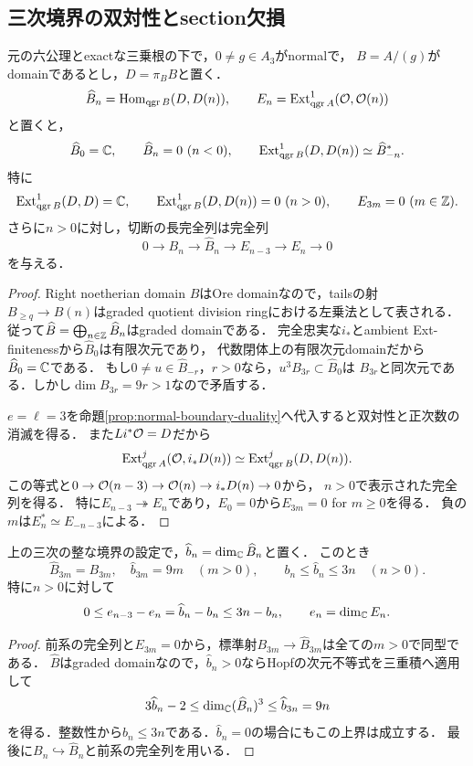 \documentclass[11pt,a4paper]{ltjsarticle}
\begin{document}
\subsection{三次境界の双対性とsection欠損}

\begin{corollary}[三次の整な境界と反標準剰余類の消滅]\label{cor:cubic-boundary-duality}
元の六公理とexactな三乗根の下で，$0\ne g\in A_3$がnormalで，
$B=A/(g)$がdomainであるとし，$D=\pi_BB$と置く．
\[
 \widehat B_n=\operatorname{Hom}_{\operatorname{qgr} B}(D,D(n)),\qquad E_n=\operatorname{Ext}^1_{\operatorname{qgr} A}(\mathcal O,\mathcal O(n))
\]
と置くと，
\[
 \widehat B_0=\C,\qquad \widehat B_n=0\ (n<0),\qquad
 \Ext^1_{\qgr B}(D,D(n))\simeq \widehat B_{-n}^*.
\]
特に
\[
 \operatorname{Ext}^1_{\operatorname{qgr} B}(D,D)=\mathbb C,\qquad
 \operatorname{Ext}^1_{\operatorname{qgr} B}(D,D(n))=0\ (n>0),\qquad E_{3m}=0\ (m\in\mathbb Z).
\]
さらに$n>0$に対し，切断の長完全列は完全列
\[
 0\to B_n\to \widehat B_n\to E_{n-3}\to E_n\to0
\]
を与える．
\end{corollary}
\begin{proof}
Right noetherian domain $B$はOre domainなので，tailsの射
$B_{\geq q}\to B(n)$はgraded quotient division ringにおける左乗法として表される．
従って$\widehat B=\bigoplus_{n\in\mathbb Z}\widehat B_n$はgraded domainである．
完全忠実な$i_*$とambient Ext-finitenessから$\widehat B_0$は有限次元であり，
代数閉体上の有限次元domainだから$\widehat B_0=\mathbb C$である．
もし$0\ne u\in \widehat B_{-r}$，$r>0$なら，$u^3B_{3r}\subset \widehat B_0$は
$B_{3r}$と同次元である．しかし$\dim B_{3r}=9r>1$なので矛盾する．

$e=\ell=3$を命題\ref{prop:normal-boundary-duality}へ代入すると双対性と正次数の消滅を得る．
また$Li^*\mathcal O=D$だから
\[
 \operatorname{Ext}^j_{\operatorname{qgr} A}(\mathcal O,i_*D(n))\simeq
 \operatorname{Ext}^j_{\operatorname{qgr} B}(D,D(n)).
\]
この等式と$0\to\mathcal O(n-3)\to\mathcal O(n)\to i_*D(n)\to0$から，
$n>0$で表示された完全列を得る．
特に$E_{n-3}\twoheadrightarrow E_n$であり，$E_0=0$から$E_{3m}=0$ for $m\geq0$を得る．
負の$m$は$E_n^*\simeq E_{-n-3}$による．
\end{proof}


\begin{corollary}[三次境界の飽和後のHilbert上界]\label{cor:cubic-saturated-hilbert}
上の三次の整な境界の設定で，$\widehat b_n=\dim_\mathbb C \widehat B_n$と置く．
このとき
\[
 \widehat B_{3m}=B_{3m},\quad \widehat b_{3m}=9m\quad(m>0),
 \qquad b_n\leq \widehat b_n\leq3n\quad(n>0).
\]
特に$n>0$に対して
\[
 0\leq e_{n-3}-e_n=\widehat b_n-b_n\leq3n-b_n,
 \qquad e_n=\dim_\mathbb C E_n.
\]
\end{corollary}
\begin{proof}
前系の完全列と$E_{3m}=0$から，標準射$B_{3m}\to \widehat B_{3m}$は全ての$m>0$で同型である．
$\widehat B$はgraded domainなので，$\widehat b_n>0$ならHopfの次元不等式を三重積へ適用して
\[
 3\widehat b_n-2\leq\dim_\mathbb C(\widehat B_n)^3\leq \widehat b_{3n}=9n
\]
を得る．整数性から$\widehat b_n\leq3n$である．$\widehat b_n=0$の場合にもこの上界は成立する．
最後に$B_n\hookrightarrow \widehat B_n$と前系の完全列を用いる．
\end{proof}
\end{document}
